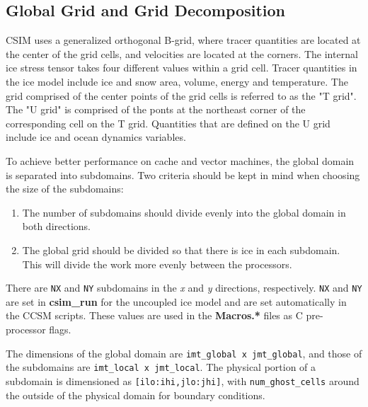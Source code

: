 
\subsection {Global Grid and Grid Decomposition} 

CSIM uses a generalized orthogonal B-grid, where tracer quantities are 
located at the center of the grid cells, and velocities are located
at the corners.  The internal ice stress tensor takes four different
values within a grid cell.  Tracer quantities in the ice model include
ice and snow area, volume, energy and temperature.  The grid comprised
of the center points of the grid cells is referred to as the "T grid".
The "U grid" is comprised of the ponts at the northeast corner of the 
corresponding cell on the T grid.  Quantities that are defined on the
U grid include ice and ocean dynamics variables.

To achieve better performance on cache and vector machines, the 
global domain is separated into subdomains.  Two criteria
should be kept in mind when choosing the size of the subdomains:

\begin{enumerate}
  \item The number of subdomains should divide evenly into the global
        domain in both directions.

  \item The global grid should be divided so that there is ice in
        each subdomain.  This will divide the work more evenly
        between the processors.
\end{enumerate}

There are {\tt NX} and {\tt NY} subdomains in the {\it x} and {\it y}
directions, respectively.  {\tt NX} and {\tt NY} are set in
{\bf csim\_run} for the uncoupled ice model and are set automatically
in the CCSM scripts.  These values are used in the {\bf Macros.*}
files as C pre-processor flags.

The dimensions of the global domain are {\tt imt\_global x jmt\_global},
and those of the  subdomains are {\tt imt\_local x jmt\_local}.  The
physical portion of a subdomain is dimensioned as {\tt [ilo:ihi,jlo:jhi]},
with {\tt num\_ghost\_cells} around the outside of the physical domain
for boundary conditions.

